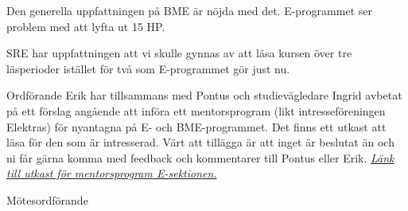 \documentclass[10pt]{article}
\def\mo{Pontus Landgren}
\begin{document}
\begin{paragrafer}
Den generella uppfattningen på BME är nöjda med det. E-programmet ser problem med att lyfta ut 15 HP. 

SRE har uppfattningen att vi skulle gynnas av att läsa kursen över tre läsperioder istället för två som E-programmet gör just nu.

Ordförande Erik har tillsammans med Pontus och studievägledare Ingrid avbetat på ett förslag angående att införa ett mentorsprogram (likt intresseföreningen Elektras) för nyantagna på E- och BME-programmet. Det finns ett utkast att läsa för den som är intresserad. Värt att tillägga är att inget är beslutat än och ni får gärna komma med feedback och kommentarer till Pontus eller Erik. 
\textit{\href{https://drive.google.com/file/d/0B7WHZ6wh42IALW9UYjl6eDBuelk/view?usp=sharing}{Länk till utkast för mentorsprogram E-sektionen.}} 

\end{paragrafer}

\hidesignfoot
\begin{signatures}{1}
\signature{\mo}{Mötesordförande}
\end{signatures}
\end{document}
